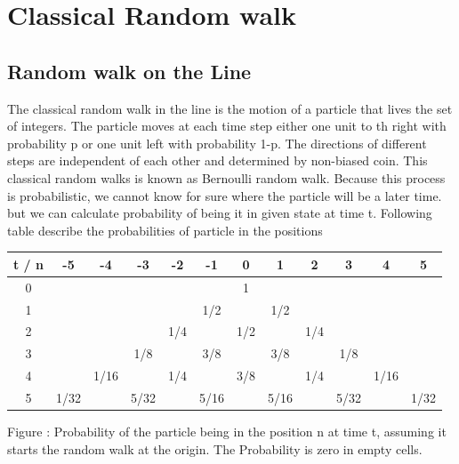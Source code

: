 \documentclass[11 pt]{article}
\theoremstyle{definition}
\theoremstyle{remark}
\begin{document}
\section{Classical Random walk}
\subsection{Random walk on the Line}
The classical random walk in the line is the motion of a particle that lives the set of integers. The particle moves at each time step either one unit to th right with probability p or one unit left with probability 1-p. The directions of different steps are independent of each other and determined by non-biased coin. This classical random walks is known as Bernoulli random walk. Because this process is probabilistic, we cannot know for sure where the particle will be a later time. but we can calculate probability of being it in given state at time t. Following table describe the probabilities of particle in the positions 

\begin{center}
\begin{tabular}{ |c|c|c|c|c|c|c|c|c|c|c|c| } 
 \hline
 t / n   & -5 & -4 & -3 & -2 & -1 & 0 & 1 & 2 & 3 & 4 & 5 \\
 \hline
 0 &  &  &  &  &  & 1 &  &  &  &  &  \\
 \hline
 1 &  &  &  &  & 1/2 &  & 1/2 &  &  &  &  \\
 \hline
 2 &  &  &  & 1/4 &  & 1/2 &  & 1/4 &  &  &  \\
 \hline
 3 &  &  & 1/8 &  & 3/8 &  & 3/8 &  & 1/8 &  &  \\
 \hline
 4 &  & 1/16 &  & 1/4 &  & 3/8 &  & 1/4 &  & 1/16 &  \\
 \hline
 5 & 1/32 &  & 5/32 &  & 5/16 &  & 5/16 &  & 5/32 &  & 1/32 \\
 \hline
\end{tabular}
\end{center}
Figure : Probability of the particle being in the position n at time t, assuming it starts the random walk at the origin. The Probability is zero in empty cells.
\end{document}
